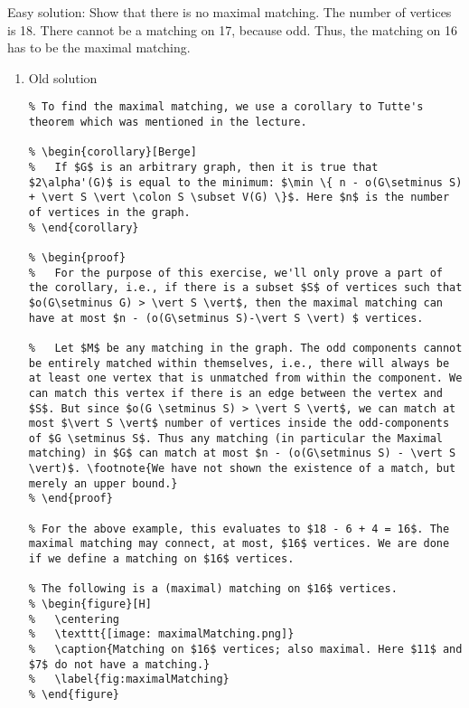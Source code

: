 \documentclass[11pt]{article}
\def\min{\operatorname{min}}
\begin{document}
Easy solution: Show that there is no maximal matching. The number of
vertices is 18. There cannot be a matching on 17, because odd. Thus, the
matching on 16 has to be the maximal matching.
\begin{enumerate}
\item Old solution
\label{sec:org9543eec}
\begin{verbatim}
% To find the maximal matching, we use a corollary to Tutte's theorem which was mentioned in the lecture.

% \begin{corollary}[Berge]
%   If $G$ is an arbitrary graph, then it is true that $2\alpha'(G)$ is equal to the minimum: $\min \{ n - o(G\setminus S) + \vert S \vert \colon S \subset V(G) \}$. Here $n$ is the number of vertices in the graph.
% \end{corollary}

% \begin{proof}
%   For the purpose of this exercise, we'll only prove a part of the corollary, i.e., if there is a subset $S$ of vertices such that $o(G\setminus G) > \vert S \vert$, then the maximal matching can have at most $n - (o(G\setminus S)-\vert S \vert) $ vertices. 

%   Let $M$ be any matching in the graph. The odd components cannot be entirely matched within themselves, i.e., there will always be at least one vertex that is unmatched from within the component. We can match this vertex if there is an edge between the vertex and $S$. But since $o(G \setminus S) > \vert S \vert$, we can match at most $\vert S \vert$ number of vertices inside the odd-components of $G \setminus S$. Thus any matching (in particular the Maximal matching) in $G$ can match at most $n - (o(G\setminus S) - \vert S \vert)$. \footnote{We have not shown the existence of a match, but merely an upper bound.}
% \end{proof}

% For the above example, this evaluates to $18 - 6 + 4 = 16$. The maximal matching may connect, at most, $16$ vertices. We are done if we define a matching on $16$ vertices.

% The following is a (maximal) matching on $16$ vertices.
% \begin{figure}[H]
%   \centering
%   \texttt{[image: maximalMatching.png]}
%   \caption{Matching on $16$ vertices; also maximal. Here $11$ and $7$ do not have a matching.}
%   \label{fig:maximalMatching}
% \end{figure}
\end{verbatim}
\end{enumerate}
\end{document}
